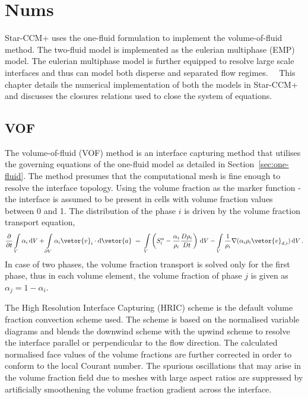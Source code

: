 \section{Nums}
Star-CCM+ uses the one-fluid formulation to implement the volume-of-fluid method. 
 The two-fluid model is implemented as the eulerian multiphase (EMP) model.
 The eulerian
 multiphase model is further equipped to resolve large scale interfaces and
 thus can model both disperse and separated flow regimes.~\cite{gadaLargeScaleInterface2017}~ 
 This chapter details the numerical implementation of both the models in Star-CCM+ and discusses 
 the closures relations used to close the system of equations.

\subsection{VOF}
The volume-of-fluid (VOF) method is an interface capturing method that utilises the governing 
 equations of the one-fluid model as detailed in Section~\ref{sec:one-fluid}. The method presumes that
 the computational mesh is fine enough to resolve the interface topology.
 Using the volume fraction as the marker function - the interface is assumed to be present
 in cells with volume fraction values between 0 and 1.
 The distribution of the phase $i$ is driven by the volume fraction transport equation,
\begin{equation}\label{eq_vof_transport}
\frac{\partial}{\partial t}\int\limits_{V} \alpha_{i}\,\mathrm{d}V +
\int\limits_{\partial V} \alpha_{i} \vetor{v}_{i} \cdot \mathrm{d}\vetor{a}\;= \;
\int\limits_{V}\left(S^{\alpha}_{i} - \frac{\alpha_{i}}{\rho_{i}} \frac{D \rho_{i}}{D t}\right)\,\mathrm{d}V
- \int\limits_{V} \frac{1}{\rho_{i}}\nabla (\alpha_{i}\rho_{i}\vetor{v}_{d,i})\,\mathrm{d}V\,.
\end{equation}
 In case of two phases, the volume fraction transport is solved only for the first phase, thus in each volume
 element, the volume fraction of phase $j$ is given as $\alpha_{j} = 1 - \alpha_{i}$.
 
The High Resolution Interface Capturing (HRIC) scheme is the default volume fraction convection scheme used.
 The scheme is based on the normalised variable diagrams and blends the downwind
 scheme with the upwind scheme to resolve the interface parallel or perpendicular to the flow direction.
 The calculated normalised face values of the volume fractions are further corrected in order 
 to conform to the local Courant number. The spurious oscillations that may arise in the volume fraction field due to meshes with large aspect ratios
 are suppressed by artificially smoothening the volume fraction gradient across the interface.~
~


